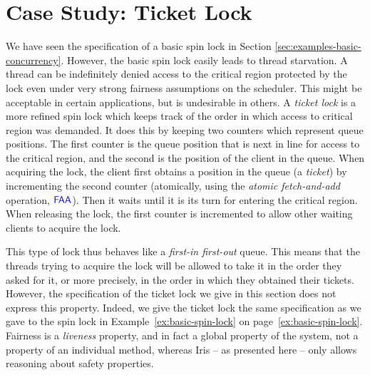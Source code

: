 \section{Case Study: Ticket Lock}
\label{sec:case-study:ticket-lock}

\renewcommand{\isLock}{\operatorname{isLock}}
\renewcommand{\locked}{\operatorname{locked}}
\newcommand{\issued}{\operatorname{issued}}
\renewcommand{\newLock}{\operatorname{newLock}}
\renewcommand{\acquire}{\operatorname{acquire}}
\newcommand{\wait}{\operatorname{wait}}
\renewcommand{\release}{\operatorname{release}}
\newcommand{\lockInv}{\operatorname{lockInv}}

We have seen the specification of a basic spin lock in Section \ref{sec:examples-basic-concurrency}.
However, the basic spin lock easily leads to thread starvation.
A thread can be indefinitely denied access to the critical region protected by the lock even under very strong fairness assumptions on the scheduler.
This might be acceptable in certain applications, but is undesirable in others.
A \emph{ticket lock} is a more refined spin lock which keeps track of the order in which access to critical region was demanded.
It does this by keeping two counters which represent queue positions.
The first counter is the queue position that is next in line for access to the critical region, and the second is the position of the client in the queue.
When acquiring the lock, the client first obtains a position in the queue (a \emph{ticket}) by incrementing the second counter (atomically, using the \emph{atomic fetch-and-add} operation, $\textsf{\color{blue} FAA}$).
Then it waits until it is its turn for entering the critical region.
When releasing the lock, the first counter is incremented to allow other waiting clients to acquire the lock.

This type of lock thus behaves like a \emph{first-in first-out} queue.
This means that the threads trying to acquire the lock will be allowed to take it in the order they asked for it, or more precisely, in the order in which they obtained their tickets.
However, the specification of the ticket lock we give in this section does not express this property.
Indeed, we give the ticket lock the same specification as we gave to the spin lock in Example~\ref{ex:basic-spin-lock} on page~\ref{ex:basic-spin-lock}.
Fairness is a \emph{liveness} property, and in fact a global property of the system, \ie{} not a property of an individual method, whereas Iris -- as presented here -- only allows reasoning about safety properties.

